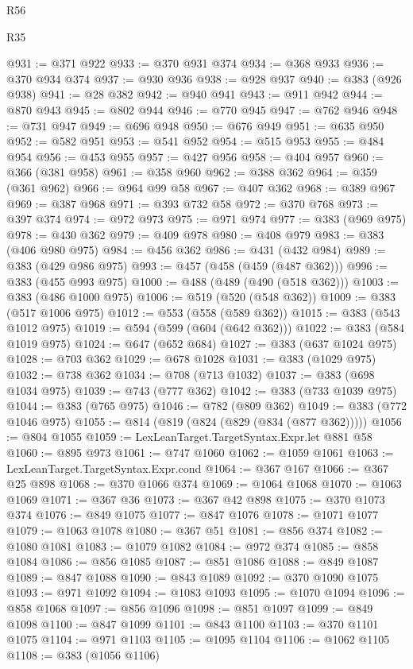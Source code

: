 \begin{lexlean}{R56}
\begin{lexlean}{R35}
\begin{coremodule}
{{{{{{{{{{{{{{{{{{{{{{{{{{{{{{{{{{{{{{{{{{{{{{{{{{{{@931 := @371 @922
@933 := @370 @931 @374
@934 := @368 @933
@936 := @370 @934 @374
@937 := @930 @936
@938 := @928 @937
@940 := @383 (@926 @938)
@941 := @28 @382
@942 := @940 @941
@943 := @911 @942
@944 := @870 @943
@945 := @802 @944
@946 := @770 @945
@947 := @762 @946
@948 := @731 @947
@949 := @696 @948
@950 := @676 @949
@951 := @635 @950
@952 := @582 @951
@953 := @541 @952
@954 := @515 @953
@955 := @484 @954
@956 := @453 @955
@957 := @427 @956
@958 := @404 @957
@960 := @366 (@381 @958)
@961 := @358 @960
@962 := @388 @362
@964 := @359 (@361 @962)
@966 := @964 @99 @58
@967 := @407 @362
@968 := @389 @967
@969 := @387 @968
@971 := @393 @732 @58
@972 := @370 @768
@973 := @397 @374
@974 := @972 @973
@975 := @971 @974
@977 := @383 (@969 @975)
@978 := @430 @362
@979 := @409 @978
@980 := @408 @979
@983 := @383 (@406 @980 @975)
@984 := @456 @362
@986 := @431 (@432 @984)
@989 := @383 (@429 @986 @975)
@993 := @457 (@458 (@459 (@487 @362)))
@996 := @383 (@455 @993 @975)
@1000 := @488 (@489 (@490 (@518 @362)))
@1003 := @383 (@486 @1000 @975)
@1006 := @519 (@520 (@548 @362))
@1009 := @383 (@517 @1006 @975)
@1012 := @553 (@558 (@589 @362))
@1015 := @383 (@543 @1012 @975)
@1019 := @594 (@599 (@604 (@642 @362)))
@1022 := @383 (@584 @1019 @975)
@1024 := @647 (@652 @684)
@1027 := @383 (@637 @1024 @975)
@1028 := @703 @362
@1029 := @678 @1028
@1031 := @383 (@1029 @975)
@1032 := @738 @362
@1034 := @708 (@713 @1032)
@1037 := @383 (@698 @1034 @975)
@1039 := @743 (@777 @362)
@1042 := @383 (@733 @1039 @975)
@1044 := @383 (@765 @975)
@1046 := @782 (@809 @362)
@1049 := @383 (@772 @1046 @975)
@1055 := @814 (@819 (@824 (@829 (@834 (@877 @362)))))
@1056 := @804 @1055
@1059 := LexLeanTarget.TargetSyntax.Expr.let @881 @58
@1060 := @895 @973
@1061 := @747 @1060
@1062 := @1059 @1061
@1063 := LexLeanTarget.TargetSyntax.Expr.cond
@1064 := @367 @167
@1066 := @367 @25 @898
@1068 := @370 @1066 @374
@1069 := @1064 @1068
@1070 := @1063 @1069
@1071 := @367 @36
@1073 := @367 @42 @898
@1075 := @370 @1073 @374
@1076 := @849 @1075
@1077 := @847 @1076
@1078 := @1071 @1077
@1079 := @1063 @1078
@1080 := @367 @51
@1081 := @856 @374
@1082 := @1080 @1081
@1083 := @1079 @1082
@1084 := @972 @374
@1085 := @858 @1084
@1086 := @856 @1085
@1087 := @851 @1086
@1088 := @849 @1087
@1089 := @847 @1088
@1090 := @843 @1089
@1092 := @370 @1090 @1075
@1093 := @971 @1092
@1094 := @1083 @1093
@1095 := @1070 @1094
@1096 := @858 @1068
@1097 := @856 @1096
@1098 := @851 @1097
@1099 := @849 @1098
@1100 := @847 @1099
@1101 := @843 @1100
@1103 := @370 @1101 @1075
@1104 := @971 @1103
@1105 := @1095 @1104
@1106 := @1062 @1105
@1108 := @383 (@1056 @1106)
}}}}}}}}}}}}}}}}}}}}}}}}}}}}}}}}}}}}}}}}}}}}}}}}}}}}
\end{coremodule}
\end{lexlean}
\end{lexlean}
